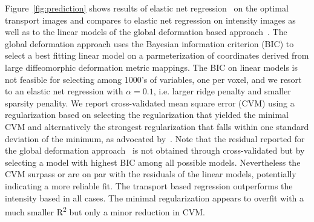 \documentclass{llncs}
\begin{document}
Figure~\ref{fig:prediction} shows results of elastic net
regression~\cite{Zou05regularizationand} on the optimal transport images and
compares to elastic net regression on intensity images as well as to the linear
models of the global deformation based approach~\cite{gerber2010manifold}. The
global deformation approach uses the Bayesian information criterion (BIC) to
select a best fitting linear model on a parmeterization of coordinates derived
from large diffeomorphic deformation metric mappings.  The BIC on linear models
is not feasible for selecting among 1000's of variables, one per voxel, and we
resort to an elastic net regression with $\alpha=0.1$, i.e. larger ridge
penalty and smaller sparsity penality. We report cross-validated mean square
error (CVM) using a regularization based on selecting the regularization that
yielded the minimal CVM and alternatively the strongest regularization that
falls within one standard deviation of the minimum, as advocated
by~\cite{Zou05regularizationand}. Note that the residual reported for the
global deformation approach~\cite{gerber2010manifold} is not obtained through
cross-validated but by selecting a model with highest BIC among all possible
models. Nevertheless the CVM surpass or are on par with the residuals of the
linear models, potentially indicating a more reliable fit.  The transport based
regression outperforms the intensity based in all cases.  The minimal
regularization appears to overfit with a much smaller R\textsuperscript{2}  but
only a minor reduction in CVM.  
\end{document}
